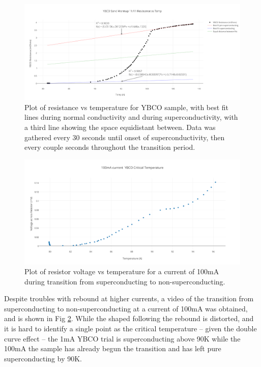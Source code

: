 \documentclass[prb,preprint]{revtex4-1}
\begin{document}
\begin{figure}[h!]
\centering
\includegraphics[width=7in]{ybco_sand_warmup_1111_resistance_vs_temp.png}
\caption{Plot of resistance vs temperature for YBCO sample, with best fit lines during normal conductivity and during superconductivity, with a third line showing the space equidistant between. Data was gathered every 30 seconds until onset of superconductivity, then every couple seconds throughout the transition period.}
\label{YBCOplot2}
\end{figure}

\begin{figure}[h!]
\centering
\includegraphics[width=7in]{100ma_current_ybco_critical_temperature}
\caption{Plot of resistor voltage vs temperature for a current of 100mA during transition from superconducting to non-superconducting.}
\label{100mA}
\end{figure}

Despite troubles with rebound at higher currents, a video of the transition from superconducting to non-superconducting at a current of 100mA was obtained, and is shown in Fig \ref{100mA}. While the shaped following the rebound is distorted, and it is hard to identify a single point as the critical temperature – given the double curve effect – the 1mA YBCO trial is superconducting above 90K while the 100mA the sample has already begun the transition and has left pure superconducting by 90K.
\end{document}
